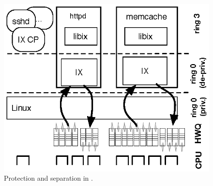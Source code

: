 \begin{figure}
\begin{centering}
\includegraphics{figs/bigpicture.eps}

\centering\caption{Protection and separation in \ix.}
\label{fig:cp-dp}
\end{centering}
\end{figure}

